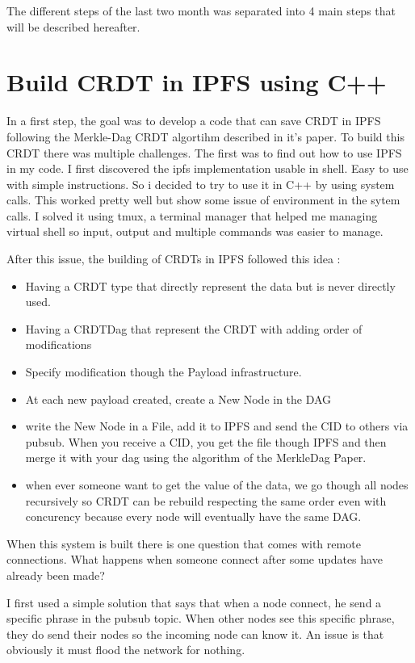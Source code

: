 \documentclass{IEEEtran}
\begin{document}
The different steps of the last two month was separated into 4 main 
steps that will be described hereafter.

\section{Build CRDT in IPFS using C++}
In a first step, the goal was to develop a code that can save CRDT
in IPFS following the Merkle-Dag CRDT algortihm described in it's 
paper. To build this CRDT there was multiple challenges. The first 
was to find out how to use IPFS in my code. I first discovered the
ipfs implementation usable in shell. Easy to use with simple 
instructions. So i decided to try to use it in C++ by using system
calls. This worked pretty well but show some issue of environment
in the sytem calls. I solved it using tmux, a terminal manager that 
helped me managing virtual shell so input, output and multiple 
commands was easier to manage.

After this issue, the building of CRDTs in IPFS followed this idea :
\begin{itemize}
\item Having a  CRDT type that directly represent the data but is never
directly used.
\item  Having a CRDTDag that represent the CRDT with adding order of 
modifications
\item  Specify modification though the Payload infrastructure.
\item  At each new payload created, create a New Node in the DAG
\item  write the New Node in a File, add it to IPFS and send the CID 
to others via pubsub. When you receive a CID, you get the file though
IPFS and then merge it with your dag using the algorithm of the 
MerkleDag Paper.
\item when ever someone want to get the value of the data, we go though
all nodes recursively so CRDT can be rebuild respecting the same order 
even with concurency because every node will eventually have the same 
DAG.
\end{itemize}

When this system is built there is one question that comes with remote
connections. What happens when someone connect after some updates have 
already been made?

I first used a simple solution that says that when a node connect, 
he send a specific phrase in the pubsub topic. When other nodes see this 
specific phrase, they do send their nodes so the incoming node can know it.
An issue is that obviously it must flood the network for nothing. 
\end{document}
